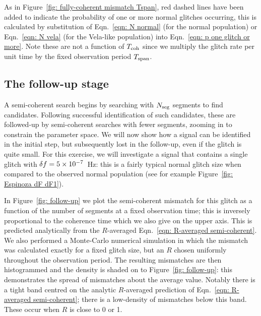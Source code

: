 \documentclass[../full_thesis/full_thesis.tex]{subfiles}
\begin{document}
As in Figure~\ref{fig: fully-coherent mismatch Tspan}, red dashed lines have
been added to indicate the probability of one or more normal glitches occurring,
this is
calculated by substitution of Eqn.~\eqref{eqn: N normal} (for the normal
population) or Eqn.~\eqref{eqn: N vela} (for the Vela-like population) into
Eqn.~\eqref{eqn: p one glitch or more}.  Note these are not a function of
$T_{\mathrm{coh}}$ since we multiply the glitch rate per unit time by the fixed
observation period $T_{\mathrm{span}}$.

\subsection{The follow-up stage}

A semi-coherent search begins by searching with $N_{\textrm{seg}}$ segments to
find candidates. Following successful identification of such candidates, these
are followed-up by semi-coherent searches with fewer segments, zooming in to
constrain the parameter space. We will now show how a signal can
be identified in the initial step, but subsequently lost in the follow-up, even
if the glitch is quite small. For this exercise, we will investigate a signal
that contains a single glitch with $\delta f=5\times10^{-7}$~Hz: this is a
fairly typical normal glitch size when compared to the observed normal population (see for
example Figure~\ref{fig: Espinoza dF dF1}).

In Figure~\ref{fig: follow-up} we plot the semi-coherent mismatch for this
glitch as a function of the number of segments at a fixed observation time; this
is inversely proportional to the coherence time which we also give on the upper
axis. This is predicted
analytically from the $R$-averaged Eqn.~\eqref{eqn: R-averaged semi-coherent}.
We also performed a Monte-Carlo numerical simulation in which the mismatch was
calculated exactly for a fixed glitch size, but an $R$ chosen uniformly
throughout the observation period. The resulting mismatches are then histogrammed and the
density is shaded on to Figure~\ref{fig: follow-up}: this demonstrates the spread of
mismatches about the average value. Notably there is a tight band centred on
the analytic $R$-averaged prediction of Eqn.~\eqref{eqn: R-averaged semi-coherent};
there is a low-density of mismatches below this band. These occur when $R$ is
close to 0 or 1.
\end{document}
